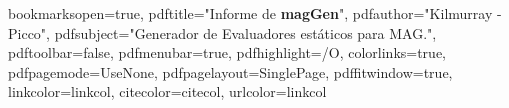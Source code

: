 \usepackage{bookman}
\usepackage[T1]{fontenc}
\usepackage[left=1.3in,right=1.1in,top=1.1in,bottom=1.1in]{geometry}
\renewcommand{\baselinestretch}{1.2}

\usepackage[nottoc]{tocbibind}
\usepackage{minitoc}
\setcounter{minitocdepth}{4}
\setcounter{parttocdepth}{1}
\mtcindent=5pt
\renewcommand\mtctitle{Contenido}
\renewcommand\mlftitle{Figuras}
\renewcommand\mlttitle{Tablas}

\usepackage{aecompl}



\newcommand{\maggen}{\textbf{magGen}}
\newcommand{\boost}{\textit{\textbf{Boost}}}
\newcommand{\spirit}{\textit{\textbf{Spirit}}}
\newcommand{\flecha}{$\hfill \Longrightarrow \hfill$}
\newcommand{\textbtt}[1]{\texttt{\textbf{#1}}}


% 

\usepackage{graphicx}
\usepackage[a4paper,pagebackref,hyperindex=true]{hyperref}
\graphicspath{{.}{images/}}

\usepackage{color}



\hypersetup
{
bookmarksopen=true,
pdftitle="Informe de \maggen",
pdfauthor="Kilmurray - Picco", 
pdfsubject="Generador de Evaluadores estáticos para MAG.", %
pdftoolbar=false, %
pdfmenubar=true, %
pdfhighlight=/O, %
colorlinks=true, %
pdfpagemode=UseNone, %
pdfpagelayout=SinglePage, %
pdffitwindow=true, %
linkcolor=linkcol, %
citecolor=citecol, %
urlcolor=linkcol %
}

